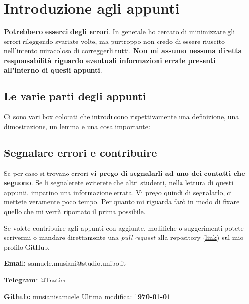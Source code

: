 \section{Introduzione agli appunti}

\textbf{Potrebbero esserci degli errori}. In generale ho cercato di minimizzare gli errori rileggendo svariate volte, ma purtroppo non credo di essere riuscito nell'intento miracoloso di correggerli tutti. \textbf{Non mi assumo nessuna diretta responsabilità riguardo eventuali informazioni errate presenti all'interno di questi appunti}.

\subsection{Le varie parti degli appunti}
Ci sono vari box colorati che introducono rispettivamente una definizione, una dimostrazione, un lemma e una cosa importante:






\subsection{Segnalare errori e contribuire}
Se per caso si trovano errori \textbf{vi prego di segnalarli ad uno dei contatti che seguono}. Se li segnalerete eviterete che altri studenti, nella lettura di questi appunti, imparino una informazione errata. Vi prego quindi di segnalarlo, ci mettete veramente poco tempo. Per quanto mi riguarda farò in modo di fixare quello che mi verrà riportato il prima possibile.\bigbreak

Se volete contribuire agli appunti con aggiunte, modifiche o suggerimenti potete scrivermi o mandare direttamente una \textit{pull request} alla repository (\href{https://github.com/musianisamuele/Analisi}{link}) sul mio profilo GitHub.\bigbreak


\textbf{Email:} samuele.musiani@studio.unibo.it\bigbreak

\textbf{Telegram:} @Tastier\bigbreak

\textbf{Github:} \href{https://github.com/musianisamuele}{musianisamuele}
\vfill\hfill Ultima modifica: \textbf{\today}
